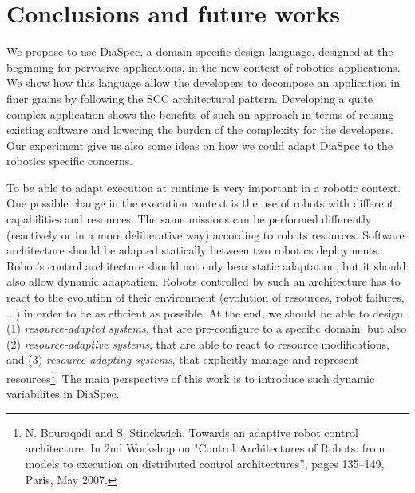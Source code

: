 
\section{Conclusions and future works}
\label{sec:conclusion}

We propose to use DiaSpec, a domain-specific design language, designed at the beginning for pervasive applications, in the new context of robotics applications. We show how this language allow the developers to decompose an application in finer grains by following the SCC architectural pattern.
Developing a quite complex application shows the benefits of such an approach in terms of reusing existing software and lowering the burden of the complexity for the developers. Our experiment give us also some ideas on how we could adapt DiaSpec to the robotics specific concerns.

To be able to adapt execution at runtime is very important in a robotic context. One possible change in the execution context is the use of robots with different capabilities and resources. The same missions can be performed differently (reactively or in a more deliberative way) according to robots resources. Software architecture should be adapted statically between two robotics deployments. Robot’s control architecture should not only bear static adaptation, but it should also allow dynamic adaptation. Robots controlled by such an architecture has to react to the evolution of their environment (evolution of resources, robot failures, ...) in order to be as efficient as possible. At the end, we should be able to design (1) \emph{resource-adapted systems}, that are pre-configure to a specific domain, but also (2) \emph{resource-adaptive systems}, that are able to react to resource modifications, and (3) \emph{resource-adapting systems}, that explicitly manage and represent resources\footnote{N. Bouraqadi and S. Stinckwich. Towards an adaptive robot control architecture. In 2nd Workshop on "Control Architectures of Robots: from models to execution on distributed control architectures”, pages 135–149, Paris, May 2007.}. The main perspective of this work is to introduce such dynamic variabilites in DiaSpec.